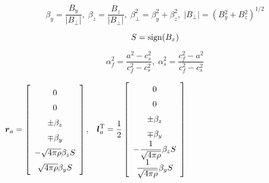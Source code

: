 \begin{equation}
\beta_{y} = \frac{{B}{}_{y}}{|{B}{}_{\bot} |}
, \;
\beta_{z} = \frac{{B}{}_{z}}{|{B}{}_{\bot} |} , \;
\beta_{\bot}^{2} = \beta_y^{2} + \beta_z^{2} , \;
|{B}{}_{\bot} | = ( {B}{}_{y}^{2} +
{B}{}_{z}^{2} ) ^{1/2}
\end{equation}

\begin{equation}
S = {\rm sign} (B_{x})
\end{equation}

\begin{equation}
\alpha_{f}^2 = \frac{a^2 - c_{s}^2}{c_{f}^2 - c_{s}^2}
, \;
\alpha_{s}^2 = \frac{c_{f}^2 - a^2}{c_{f}^2 - c_{s}^2}
\end{equation}

\newpage

\begin{center}
$\renewcommand{\arraystretch}{1.5}
\mbox{\boldmath $r$}_{a} =
\left[
\begin{array}{c}
0 \\
0 \\
\pm \beta_{z} \\
\mp \beta_{y} \\
- \sqrt{4\pi\rho}\beta_z S\\ 
\sqrt{4\pi\rho}\beta_y S\\ 
\end{array} 
\right]$, $\;$
$\renewcommand{\arraystretch}{1.5}
\displaystyle
\mbox{\boldmath $l$}_{a}^{\rm T} =
\frac{1}{2}
\left[
\begin{array}{c}
0 \\
0 \\
\pm \beta_{z} \\
\mp \beta_{y} \\
\displaystyle - \frac1{\sqrt{4\pi\rho}}\beta_z S \\ 
\displaystyle \frac1{\sqrt{4\pi\rho}}\beta_y S \\ 
\end{array}
\right]$ 
\end{center}

